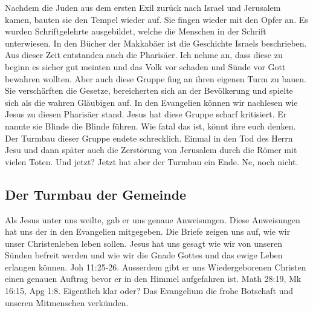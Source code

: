 \documentclass[14pt]{../../inc/mybib}
\begin{document}
    Nachdem die Juden aus dem ersten Exil zurück nach Israel und Jerusalem kamen, bauten sie den Tempel wieder auf. Sie fingen wieder mit den Opfer an. Es wurden Schriftgelehrte ausgebildet, welche die Menschen in der Schrift unterwiesen. In den Bücher der Makkabäer ist die Geschichte Israels beschrieben. Aus dieser Zeit entstanden auch die Pharisäer. Ich nehme an, dass diese zu beginn es sicher gut meinten und das Volk vor schaden und Sünde vor Gott bewahren wollten. Aber auch diese Gruppe fing an ihren eigenen Turm zu bauen. Sie verschärften die Gesetze, bereicherten sich an der Bevölkerung und spielte sich als die wahren Gläubigen auf. In den Evangelien können wir nachlesen wie Jesus zu diesen Pharisäer stand. Jesus hat diese Gruppe scharf kritisiert. Er nannte sie Blinde die Blinde führen.  Wie fatal das ist, könnt ihre euch denken. Der Turmbau dieser Gruppe endete schrecklich. Einmal in den Tod des Herrn Jesu und dann später auch die Zerstörung von Jerusalem durch die Römer mit vielen Toten. Und jetzt? Jetzt hat aber der Turmbau ein Ende. Ne, noch nicht.

    \subsection{Der Turmbau der Gemeinde}
    Als Jesus unter uns weilte, gab er uns genaue Anweisungen. Diese Anweisungen hat uns der \herr{} in den Evangelien mitgegeben. Die Briefe zeigen uns auf, wie wir unser Christenleben leben sollen. Jesus hat uns gesagt wie wir von unseren Sünden befreit werden und wie wir die Gnade Gottes und das ewige Leben erlangen können. Joh 11:25-26. Ausserdem gibt er uns Wiedergeborenen Christen einen genauen Auftrag bevor er in den Himmel aufgefahren ist. Math 28:19, Mk 16:15, Apg 1:8. Eigentlich klar oder? Das Evangelium die frohe Botschaft und unseren Mitmenschen verkünden.
\end{document}
